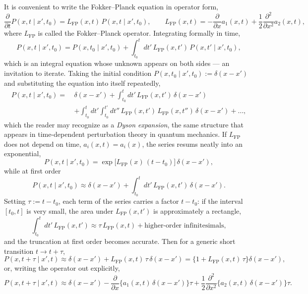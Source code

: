 It is convenient to write the Fokker--Planck equation in operator form,
\begin{equation}
\frac{\partial}{\partial t}P(x,t\mid x',t_0) = L_{\mathrm{FP}}(x,t)\,P(x,t\mid x',t_0),\qquad
L_{\mathrm{FP}}(x,t) = -\frac{\partial}{\partial x}a_1(x,t) + \frac{1}{2}\frac{\partial^2}{\partial x^2}a_2(x,t),
\end{equation}
where $L_{\mathrm{FP}}$ is called the Fokker--Planck operator.
Integrating formally in time,
\begin{equation}
P(x,t\mid x',t_0) = P(x,t_0\mid x',t_0) + \int_{t_0}^{t} dt'\, L_{\mathrm{FP}}(x,t')\,P(x,t'\mid x',t_0),
\end{equation}
which is an integral equation whose unknown appears on both sides --- an invitation to iterate.
Taking the initial condition $P(x,t_0\mid x',t_0):=\delta(x-x')$ and substituting the equation into itself repeatedly,
\begin{equation}
\begin{aligned}
P(x,t\mid x',t_0) =\ & \delta(x-x') + \int_{t_0}^{t} dt'\, L_{\mathrm{FP}}(x,t')\,\delta(x-x')\\
& + \int_{t_0}^{t} dt'\int_{t_0}^{t'} dt''\, L_{\mathrm{FP}}(x,t')\,L_{\mathrm{FP}}(x,t'')\,\delta(x-x') + \dots,
\end{aligned}
\end{equation}
which the reader may recognize as a \emph{Dyson expansion}, the same structure that appears in time-dependent perturbation theory in quantum mechanics.
If $L_{\mathrm{FP}}$ does not depend on time, $a_i(x,t)=a_i(x)$, the series resums neatly into an exponential,
\begin{equation}
P(x,t\mid x',t_0) = \exp\!\big[L_{\mathrm{FP}}(x)\,(t-t_0)\big]\,\delta(x-x'),
\end{equation}
while at first order
\begin{equation}
P(x,t\mid x',t_0) \approx \delta(x-x') + \int_{t_0}^{t} dt'\, L_{\mathrm{FP}}(x,t')\,\delta(x-x').
\end{equation}
Setting $\tau := t-t_0$, each term of the series carries a factor $t-t_0$: if the interval $[t_0,t]$ is very small, the area under $L_{\mathrm{FP}}(x,t')$ is approximately a rectangle,
\begin{equation}
\int_{t_0}^{t} dt'\, L_{\mathrm{FP}}(x,t') \approx \tau\,L_{\mathrm{FP}}(x,t) + \text{higher-order infinitesimals},
\end{equation}
and the truncation at first order becomes accurate.
Then for a generic short transition $t\to t+\tau$,
\begin{equation}
P(x,t+\tau\mid x',t) \approx \delta(x-x') + L_{\mathrm{FP}}(x,t)\,\tau\,\delta(x-x') = \big\{1 + L_{\mathrm{FP}}(x,t)\,\tau\big\}\delta(x-x'),
\end{equation}
or, writing the operator out explicitly,
\begin{equation}
P(x,t+\tau\mid x',t) \approx \delta(x-x') - \frac{\partial}{\partial x}\big\{a_1(x,t)\,\delta(x-x')\big\}\tau + \frac{1}{2}\frac{\partial^2}{\partial x^2}\big\{a_2(x,t)\,\delta(x-x')\big\}\tau.
\end{equation}

